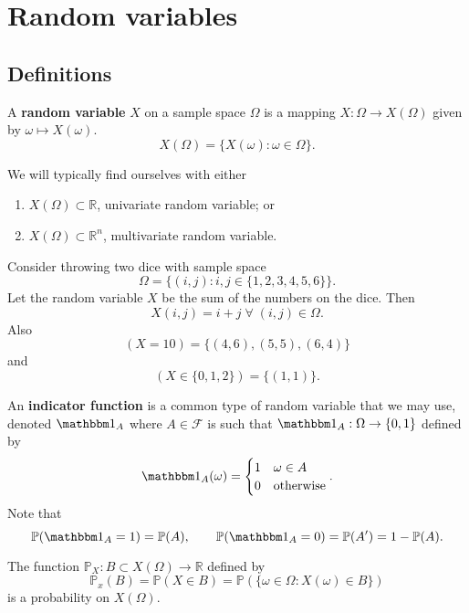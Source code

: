 \chapter{Random variables}

\section{Definitions}

\begin{definition}
    A \textbf{random variable} $X$ on a sample space $\Omega$ is a mapping $X : \Omega \to X(\Omega)$ given by $\omega \mapsto X(\omega)$. \[ X(\Omega) = \{ X(\omega) : \omega \in \Omega \}. \]
\end{definition}

We will typically find ourselves with either
\begin{enumerate}
    \item $X(\Omega) \subset \mathbb R$, univariate random variable; or
    \item $X(\Omega) \subset \mathbb R^n$, multivariate random variable.
\end{enumerate}

\begin{example}
    Consider throwing two dice with sample space \[ \Omega = \{ (i, j) : i, j \in \{ 1, 2, 3, 4, 5, 6 \} \}. \] Let the random variable $X$ be the sum of the numbers on the dice. Then \[ X(i, j) = i + j \; \forall \; (i, j) \in \Omega. \] Also \[ (X = 10) = \{ (4, 6), (5, 5), (6, 4) \} \] and \[ (X \in \{ 0, 1, 2 \}) = \{ (1, 1) \}. \]
\end{example}

\begin{definition}
An \textbf{indicator function} is a common type of random variable that we may use, denoted $\mathbbm 1_A$ where $A \in \mathcal F$ is such that $\mathbbm 1_A : \Omega \to \{ 0, 1 \}$ defined by \[ \mathbbm 1_A(\omega) = \begin{cases} 1 & \omega \in A \\ 0 & \text{otherwise} \end{cases}. \] Note that \[ \mathbb P(\mathbbm 1_A = 1) = \mathbb P(A), \qquad \mathbb P(\mathbbm 1_A = 0) = \mathbb P(A') = 1 - \mathbb P(A). \]
\end{definition}

\begin{theorem}
   The function $\mathbb P_X : B \subset X(\Omega) \to \mathbb R$ defined by \[ \mathbb P_x(B) = \mathbb P(X \in B) = \mathbb P(\{ \omega \in \Omega : X(\omega) \in B \}) \] is a probability on $X(\Omega)$.
\end{theorem}

